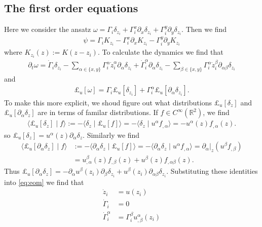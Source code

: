 \documentclass[12pt]{amsart}
\newcommand{\R}{\ensuremath{\mathbb{R}}}
\begin{document}
\subsection{The first order equations}
Here we consider the ansatz $\omega = \Gamma_i \delta_{z_i} + \Gamma^{x}_i \partial_x \delta_{z_i} + \Gamma_i^y \partial_y \delta_{z_i}$.
Then we find
\begin{align*}
  \psi = \Gamma_i K_{z_i} - \Gamma^x_i \partial_x K_{z_i} - \Gamma^y_i \partial_y K_{z_i}
\end{align*}
where $K_{z_i}(z) := K(z-z_i)$.
To calculate the dynamics we find that
\begin{align*}
  \partial_t \omega = \dot{\Gamma}_i \delta_{z_i} -  \sum_{\alpha \in \{x,y\}} \Gamma_i^\alpha \dot{z}_i^{\alpha} \partial_\alpha \delta_{z_i} + \dot{\Gamma}^\alpha_i \partial_\alpha \delta_{z_i} -  \sum_{\beta \in \{x,y\}} \Gamma^\alpha_i \dot{z}_i^{\beta} \partial_{\alpha \beta} \delta_{z_i}
\end{align*}
and
\begin{align*}
  \pounds_u [\omega] = \Gamma_i \pounds_u[\delta_{z_i}] + \Gamma_i^\alpha \pounds_u[ \partial_\alpha \delta_{z_i}].
\end{align*}
To make this more explicit, we shoud figure out what distributions $\pounds_u[\delta_{z}]$ and $\pounds_u[\partial_\alpha \delta_{z}]$ are in terms of familar distributions.  If $f \in C^{\infty}(\R^2)$, we find
\begin{align*}
  \langle \pounds_u[\delta_{z}] \mid f \rangle := - \langle \delta_{z} \mid \pounds_u[f] \rangle = - \langle \delta_{z} \mid u^\alpha f_{,\alpha} \rangle = - u^\alpha(z) f_{,\alpha}(z).
\end{align*}
so $\pounds_u[\delta_{z}] = u^\alpha(z) \partial_\alpha \delta_{z}$.
Similarly we find
\begin{align*}
  \langle \pounds_u [ \partial_\alpha \delta_{z}]  \mid f \rangle
  &:= - \langle \partial_\alpha \delta_{z} \mid \pounds_u[f] \rangle
  = - \langle \partial_\alpha \delta_{z} \mid u^\alpha  f_{,\alpha} \rangle 
  = \partial_\alpha |_{z} ( u^\beta f_{,\beta})\\
  &= u^\beta_{,\alpha}(z) f_{,\beta}(z) + u^\beta(z) f_{,\alpha\beta}(z).
\end{align*}
Thus $\pounds_u[\partial_\alpha \delta_{z}] = -  \partial_\alpha u^\beta(z_i) \partial_\beta \delta_{z_i} + u^\beta(z_i) \partial_{\alpha\beta} \delta_{z_i}$.
Substituting these identities into \eqref{eq:eom} we find that
\begin{align*}
  \dot{z}_i &= u(z_i) \\
  \dot{\Gamma}_i &= 0 \\
  \dot{\Gamma}^\alpha_i &= \Gamma_i^\beta u^\alpha_{,\beta}(z_i)
\end{align*}
\end{document}
